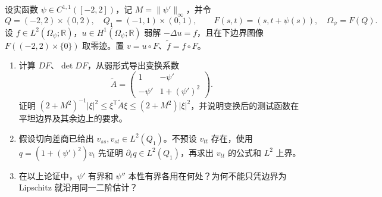 \begin{optionalexercise}[边界平坦化与法向通量]\label{b2:ex:16-flattening-flux}
设实函数 \(\psi\in C^{1,1}([-2,2])\)，记 \(M=\|\psi'\|_\infty\)，并令
\[
 Q=(-2,2)\times(0,2),\quad Q_1=(-1,1)\times(0,1),\qquad
 F(s,t)=(s,t+\psi(s)),\quad \Omega_\psi=F(Q).
\]
设 \(f\in L^2(\Omega_\psi;\mathbb R)\)，\(u\in H^1(\Omega_\psi;\mathbb R)\) 弱解 \(-\Delta u=f\)，且在下边界图像 \(F((-2,2)\times\{0\})\) 取零迹。置 \(v=u\circ F\)、\(\widetilde f=f\circ F\)。
\begin{enumerate}
\item\label{b2:item:16-flux-coordinate}计算 \(DF\)、\(\det DF\)，从弱形式导出变换系数
\[
 \widetilde A=\begin{pmatrix}1&-\psi'\\-\psi'&1+(\psi')^2\end{pmatrix}.
\]
证明 \((2+M^2)^{-1}|\xi|^2\le\xi^{\mathsf T}\widetilde A\xi\le(2+M^2)|\xi|^2\)，并说明变换后的测试函数在平坦边界及其余边上的要求。
\item\label{b2:item:16-flux-recovery}假设切向差商已给出 \(v_{ss},v_{st}\in L^2(Q_1)\)。不预设 \(v_{tt}\) 存在，使用 \(q=(1+(\psi')^2)v_t\) 先证明 \(\partial_tq\in L^2(Q_1)\)，再求出 \(v_{tt}\) 的公式和 \(L^2\) 上界。
\item\label{b2:item:16-flux-geometry}在以上论证中，\(\psi'\) 有界和 \(\psi''\) 本性有界各用在何处？为何不能只凭边界为 Lipschitz 就沿用同一二阶估计？
\end{enumerate}
\end{optionalexercise}
